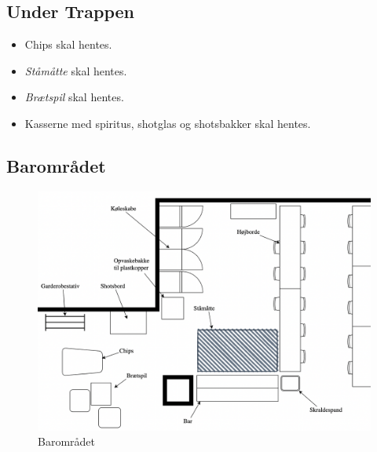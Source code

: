 \subsection{Under Trappen}
\label{sec:pre:under-trappen}

\begin{itemize}
	\item Chips skal hentes.
	\item \textit{Ståmåtte} skal hentes.
	\item \textit{Brætspil} skal hentes.
	\item Kasserne med spiritus, shotglas og shotsbakker skal hentes.
\end{itemize}

\subsection{Barområdet}
\label{sec:pre:baromradet}

\begin{figure}[H]
	\centering
	\includegraphics[width=\linewidth]{billeder/baromraadet_w_labels.png}
	\caption{Barområdet}
	\label{fig:baromraadet}
\end{figure}

